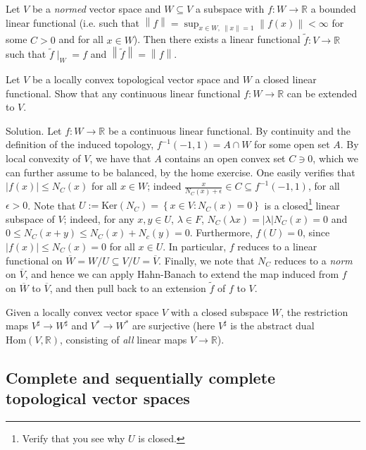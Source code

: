 \documentclass[12pt, reqno,a4paper, twoside]{amsproc}
\renewcommand{\ker}{\mathrm{Ker}}
\renewcommand{\hom}{\mathrm{Hom}}
\newcommand{\dbR}{\mathbb R}
\newcommand{\set}[1]{\left\{{#1}\right\}}
\newcommand{\norm}[1]{\left\|#1\right\|}
\newcommand{\abs}[1]{\left|#1\right|}
\renewcommand{\tilde}{\widetilde}
\newenvironment{sol}{\sc Solution. \rm}{\hfill \qedsymbol\bigskip}
\begin{document}
\begin{theo}
	Let $V$ be a \emph{normed} vector space and $W\subseteq V$ a subspace with $f:W\to \dbR$ a bounded linear functional (i.e. such that $\norm{f}=\sup_{x\in W,\: \norm{x}=1}\norm{f(x)}<\infty$ for some $C>0$ and for all $x\in W$). Then there exists a linear functional $\tilde{f}:V\to \dbR$ such that $\tilde{f}\mid_W=f$ and $\norm{\tilde{f}}=\norm{f}$. 
\end{theo}
\begin{exer}
	Let $V$ be a locally convex topological vector space and $W$ a closed linear functional. Show that any continuous linear functional $f:W\to \dbR$ can be extended to $V$. 
\end{exer}
\begin{sol}\renewcommand{\bar}{\overline}
	Let $f:W\to \dbR$ be a continuous linear functional. By continuity and the definition of the induced topology, $f^{-1}(-1,1)=A\cap W$ for some open set $A$. By local convexity of $V$, we have that $A$ contains an open convex set $C\ni 0$, which we can further assume to be balanced, by the home exercise. One easily verifies that $\abs{f(x)}\le N_C(x)$ for all $x\in W$; indeed $\frac{x}{N_C(x)+\epsilon}\in C\subseteq f^{-1}(-1,1)$, for all $\epsilon>0$. Note that $U:=\ker(N_C)=\set{x\in V:N_C(x)=0}$ is a closed\footnote{Verify that you see why $U$ is closed.} linear subspace of $V$; indeed, for any $x,y\in U$, $\lambda\in F$, $N_C(\lambda x)=\abs{\lambda}N_C(x)=0$ and $0\le N_C(x+y)\le N_C(x)+N_c(y)=0$. Furthermore, $f(U)=0$, since $\abs{f(x)}\le N_C(x)=0$ for all $x\in U$. In particular, $f$ reduces to a linear functional on $\bar{W}=W/U\subseteq V/U=\bar{V}$. Finally, we note that $N_C$ reduces to a  \emph{norm} on $\bar{V}$, and hence we can apply Hahn-Banach to extend the map induced from $f$ on $\bar{W}$ to $\bar{V}$, and then pull back to an extension $\tilde{f}$ of $f$ to $V$.
\end{sol}

\begin{corol}
	Given a locally convex vector space $V$ with a closed subspace $W$, the restriction maps $V^\sharp\to W^\sharp$ and $V^*\to W^*$ are surjective (here $V^\sharp$ is the abstract dual $\hom(V,\dbR)$, consisting of \emph{all} linear maps $V\to\dbR$).
\end{corol}

\subsection{Complete and sequentially complete topological vector spaces}
\end{document}
